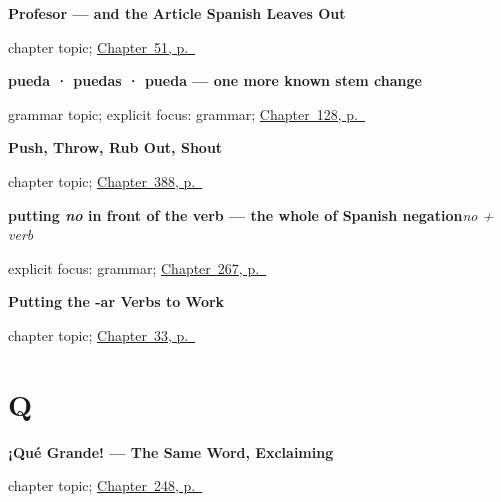 \noindent\begin{minipage}[t]{\linewidth}
\raggedright
\textbf{Profesor --- and the Article Spanish Leaves Out}\par
\footnotesize chapter topic; \hyperref[ch:profesor]{Chapter~51, p.~\pageref*{ch:profesor}}
\end{minipage}\par\smallskip

\noindent\begin{minipage}[t]{\linewidth}
\raggedright
\textbf{pueda · puedas · pueda — one more known stem change}\par
\footnotesize grammar topic; explicit focus: grammar; \hyperref[ch:spanish-subjuntivo-yo-stem]{Chapter~128, p.~\pageref*{ch:spanish-subjuntivo-yo-stem}}
\end{minipage}\par\smallskip

\noindent\begin{minipage}[t]{\linewidth}
\raggedright
\textbf{Push, Throw, Rub Out, Shout}\par
\footnotesize chapter topic; \hyperref[ch:empujar-y-lanzar]{Chapter~388, p.~\pageref*{ch:empujar-y-lanzar}}
\end{minipage}\par\smallskip

\noindent\begin{minipage}[t]{\linewidth}
\raggedright
\textbf{putting \emph{no} in front of the verb — the whole of Spanish negation}\enspace\emph{no + verb}\par
\footnotesize explicit focus: grammar; \hyperref[ch:es-negate-and-ask]{Chapter~267, p.~\pageref*{ch:es-negate-and-ask}}
\end{minipage}\par\smallskip

\noindent\begin{minipage}[t]{\linewidth}
\raggedright
\textbf{Putting the -ar Verbs to Work}\par
\footnotesize chapter topic; \hyperref[ch:spanish-ar-practice]{Chapter~33, p.~\pageref*{ch:spanish-ar-practice}}
\end{minipage}\par\smallskip

\section*{Q}

\noindent\begin{minipage}[t]{\linewidth}
\raggedright
\textbf{¡Qué Grande! --- The Same Word, Exclaiming}\par
\footnotesize chapter topic; \hyperref[ch:que-grande]{Chapter~248, p.~\pageref*{ch:que-grande}}
\end{minipage}\par\smallskip

